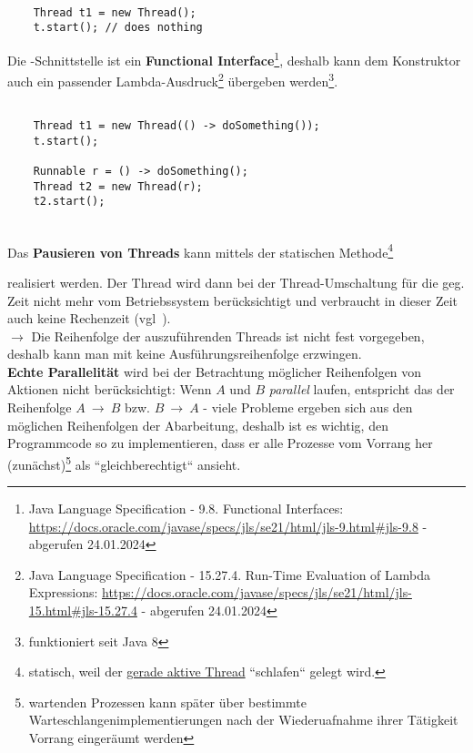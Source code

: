 \begin{verbatim}

    Thread t1 = new Thread();
    t.start(); // does nothing

\end{verbatim}


Die -Schnittstelle ist ein \textbf{Functional Interface}\footnote{
    Java Language Specification - 9.8. Functional Interfaces: \url{https://docs.oracle.com/javase/specs/jls/se21/html/jls-9.html#jls-9.8} - abgerufen 24.01.2024
}, deshalb kann dem Konstruktor auch ein passender Lambda-Ausdruck\footnote{
    Java Language Specification - 15.27.4. Run-Time Evaluation of Lambda Expressions: \url{https://docs.oracle.com/javase/specs/jls/se21/html/jls-15.html#jls-15.27.4}  - abgerufen 24.01.2024
} übergeben werden\footnote{funktioniert seit Java 8}.

\begin{verbatim}

    Thread t1 = new Thread(() -> doSomething());
    t.start();

    Runnable r = () -> doSomething();
    Thread t2 = new Thread(r);
    t2.start();

\end{verbatim}\\

Das \textbf{Pausieren von Threads} kann mittels der statischen Methode\footnote{
    statisch, weil der \underline{gerade aktive Thread} ``schlafen`` gelegt wird.
}
\begin{center}
 
\end{center}
realisiert werden.
Der Thread wird dann bei der Thread-Umschaltung für die geg. Zeit nicht mehr vom Betriebssystem berücksichtigt und verbraucht in dieser Zeit auch keine Rechenzeit (vgl~\cite[16]{Oec22}).\\

$\rightarrow$ Die Reihenfolge der auszuführenden Threads ist nicht fest vorgegeben, deshalb kann man mit  keine Ausführungsreihenfolge erzwingen.\\

\textbf{Echte Parallelität} wird bei der Betrachtung möglicher Reihenfolgen von Aktionen nicht berücksichtigt: Wenn $A$ und $B$ \textit{parallel} laufen, entspricht das der Reihenfolge $A\ \rightarrow\ B$ bzw. $B\ \rightarrow\ A$ - viele Probleme ergeben sich aus den möglichen Reihenfolgen der Abarbeitung, deshalb ist es wichtig, den Programmcode so zu implementieren, dass er alle Prozesse vom Vorrang her (zunächst)\footnote{
wartenden Prozessen kann später über bestimmte Warteschlangenimplementierungen nach der Wiederuafnahme ihrer Tätigkeit Vorrang eingeräumt werden
} als ``gleichberechtigt`` ansieht.

